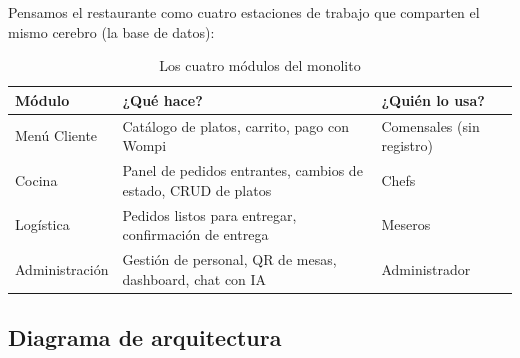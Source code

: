 \documentclass[12pt,a4paper]{article}
\begin{document}
Pensamos el restaurante como cuatro estaciones de trabajo que comparten el mismo cerebro (la base de datos):

\begin{table}[H]
\centering
{}
\begin{tabular}{p{2.5cm} p{5cm} p{5cm}}
\toprule
\rowcolor{thomas!20}\textbf{Módulo} & \textbf{¿Qué hace?} & \textbf{¿Quién lo usa?} \\
\midrule
Menú Cliente & Catálogo de platos, carrito, pago con Wompi & Comensales (sin registro) \\
Cocina & Panel de pedidos entrantes, cambios de estado, CRUD de platos & Chefs \\
Logística & Pedidos listos para entregar, confirmación de entrega & Meseros \\
Administración & Gestión de personal, QR de mesas, dashboard, chat con IA & Administrador \\
\bottomrule
\end{tabular}
\caption{Los cuatro módulos del monolito}
\end{table}

\subsection{Diagrama de arquitectura}
\end{document}
